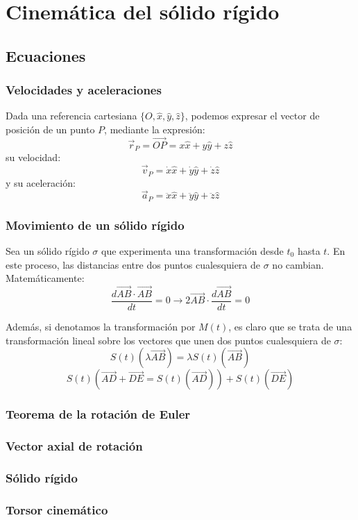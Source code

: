 \chapter{Cinemática	del sólido rígido}
\section{Ecuaciones}
\subsection{Velocidades y aceleraciones}
Dada una referencia cartesiana $\{O, \hat{x}, \hat{y}, \hat{z}\}$, podemos expresar el vector de posición de un punto $P$, mediante la expresión:
\[ \vec{r}_P = \vec{OP} = x \hat{x} + y \hat{y} + z \hat{z} \]
su velocidad:
\[ \vec{v}_P = \dot{x} \hat{x} + \dot{y} \hat{y} + \dot{z} \hat{z} \]
y su aceleración:
\[ \vec{a}_P = \ddot{x} \hat{x} + \ddot{y} \hat{y} + \ddot{z} \hat{z} \]

\subsection{Movimiento de un sólido rígido}
Sea un sólido rígido $\sigma$ que experimenta una transformación desde $t_0$ hasta $t$. En este proceso, las distancias entre dos puntos cualesquiera de $\sigma$ no cambian. Matemáticamente:
\[ \frac{d \vec{AB} \cdot \vec{AB}}{dt} = 0 \rightarrow 2 \vec{AB} \cdot \frac{d \vec{AB}}{dt} = 0 \]

Además, si denotamos la transformación por $M(t)$, es claro que se trata de una transformación lineal sobre los vectores que unen dos puntos cualesquiera de $\sigma$:
\[ S(t) (\lambda \vec{AB}) = \lambda S(t) (\vec{AB}) \]
\[ S(t) (\vec{AD} + \vec{DE} = S(t) (\vec{AD})) + S(t) (\vec{DE}) \]

\subsection{Teorema de la rotación de Euler}

\subsection{Vector axial de rotación}

\subsection{Sólido rígido}

\subsection{Torsor cinemático}

